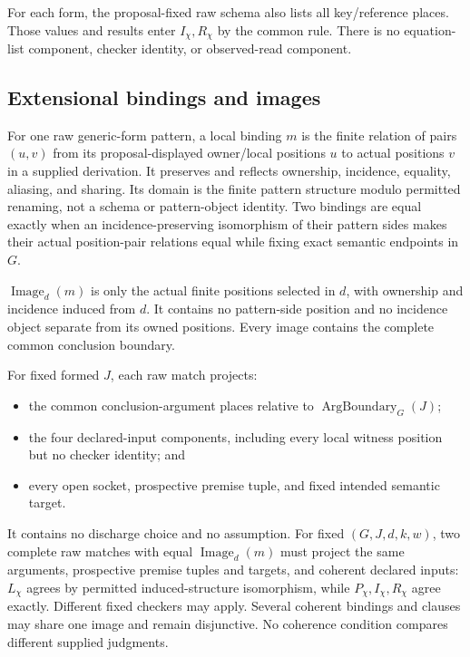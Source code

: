 \documentclass[11pt,twoside]{article}
\begin{document}
For each form, the proposal-fixed raw schema also lists all key/reference places.
Those values and results enter \(I_\chi,R_\chi\) by the common rule.  There is no
equation-list component, checker identity, or observed-read component.

\subsection{Extensional bindings and images}

For one raw generic-form pattern, a local binding \(m\) is the finite relation of
pairs \((u,v)\) from its proposal-displayed owner/local positions \(u\) to actual
positions \(v\) in a supplied derivation.  It preserves and reflects ownership,
incidence, equality, aliasing, and sharing.  Its domain is the finite pattern
structure modulo permitted renaming, not a schema or pattern-object identity.
Two bindings are equal exactly when an incidence-preserving isomorphism of their
pattern sides makes their actual position-pair relations equal while fixing exact
semantic endpoints in \(G\).

\(\operatorname{Image}_d(m)\) is only the actual finite positions selected in
\(d\), with ownership and incidence induced from \(d\).  It contains no
pattern-side position and no incidence object separate from its owned positions.
Every image contains the complete common conclusion boundary.

For fixed formed \(J\), each raw match projects:

\begin{itemize}[leftmargin=2em]
  \item the common conclusion-argument places relative to
        \(\operatorname{ArgBoundary}_G(J)\);
  \item the four declared-input components, including every local witness position
        but no checker identity; and
  \item every open socket, prospective premise tuple, and fixed intended semantic
        target.
\end{itemize}

It contains no discharge choice and no assumption.  For fixed
\((G,J,d,k,w)\), two complete raw matches with equal
\(\operatorname{Image}_d(m)\) must project the same arguments, prospective premise
tuples and targets, and coherent declared inputs: \(L_\chi\) agrees by permitted
induced-structure isomorphism, while \(P_\chi,I_\chi,R_\chi\) agree exactly.
Different fixed checkers may apply.  Several coherent bindings and clauses may
share one image and remain disjunctive.  No coherence condition compares different
supplied judgments.
\end{document}
